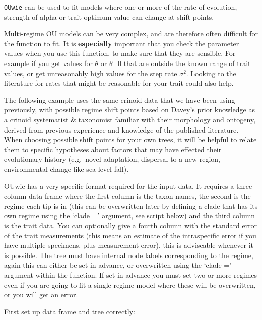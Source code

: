 \documentclass[]{article}
\begin{document}
\texttt{OUwie} can be used to fit models where one or more of the rate
of evolution, strength of alpha or trait optimum value can change at
shift points.

Multi-regime OU models can be very complex, and are therefore often
difficult for the function to fit. It is \textbf{especially} important
that you check the parameter values when you use this function, to make
sure that they are sensible. For example if you get values for
\(\theta\) or \(\theta\)\_0 that are outside the known range of trait
values, or get unreasonably high values for the step rate
\(\sigma^{2}\). Looking to the literature for rates that might be
reasonable for your trait could also help.

The following example uses the same crinoid data that we have been using
previously, with possible regime shift points based on Davey's prior
knowledge as a crinoid systematist \& taxonomist familiar with their
morphology and ontogeny, derived from previous experience and knowledge
of the published literature. When choosing possible shift points for
your own trees, it will be helpful to relate them to specific hypotheses
about factors that may have effected their evolutionary history
(e.g.~novel adaptation, dispersal to a new region, environmental change
like sea level fall).

OUwie has a very specific format required for the input data. It
requires a three column data frame where the first column is the taxon
names, the second is the regime each tip is in (this can be overwritten
later by defining a clade that has its own regime using the `clade ='
argument, see script below) and the third column is the trait data. You
can optionally give a fourth column with the standard error of the trait
measurements (this means an estimate of the intraspecific error if you
have multiple specimens, plus measurement error), this is adviseable
whenever it is possible. The tree must have internal node labels
corresponding to the regime, again this can either be set in advance, or
overwritten using the `clade =' argument within the function. If set in
advance you must set two or more regimes even if you are going to fit a
single regime model where these will be overwritten, or you will get an
error.

First set up data frame and tree correctly:
\end{document}

